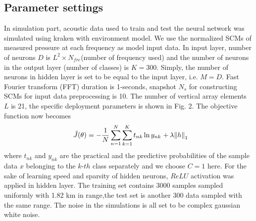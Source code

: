 \subsection{Parameter settings}
In simulation part, acoustic data used to train and test the neural network was simulated using kraken\cite{porter1992kraken} with environment model.  We use the normalized SCMs of measured pressure at each frequency as model input data. In input layer, number of neurons $D$ is $L^{2} \times N_{fre}$(number of frequency used) and the number of neurons in the output layer (number of classes) is $K = 300$. Simply, the number of neurons in hidden layer is set to be equal to the input layer, i.e. $M = D$. Fast	Fourier	transform (FFT) duration is 1-seconds, snapshot $N_{s}$ for constructing SCMs for input data preprocessing is 10. The number of vertical array elements $L$ is 21, the specific deployment parameters is shown in Fig. 2.
The objective function now becomes
\begin{equation}
{\kern 1pt} {\kern 1pt} {\kern 1pt} {\kern 1pt} {\kern 1pt} {\kern 1pt} \tilde J(\theta ){\kern 1pt} {\kern 1pt} {\kern 1pt} {\rm{ = }}{\kern 1pt} {\kern 1pt} {\kern 1pt} {\rm{ - }}{{\rm{1}} \over N}\sum\limits_{n = 1}^N {\sum\limits_{k = 1}^K {{t_{nk}}\ln {y_{nk}}{\kern 1pt} {\kern 1pt} {\kern 1pt} {\rm{ + }}{\kern 1pt} {\kern 1pt} \lambda {{\left\| h \right\|}_1}} }
\end{equation}
where $t_{nk}$ and $y_{nk}$ are the practical and the predictive probabilities of the sample data $x$ belonging to the $k$-$th$ class separately and we choose $C=1$ here.
For the sake of learning speed and sparsity of hidden neurons, $ReLU$ activation\cite{goodfellow2016deep} was applied in hidden layer.
The training set contains 3000 samples sampled uniformly with 1.82 km in range,the test set is another 300 data sampled with the same range. The noise in the simulations is all set to be complex gaussian white noise.


